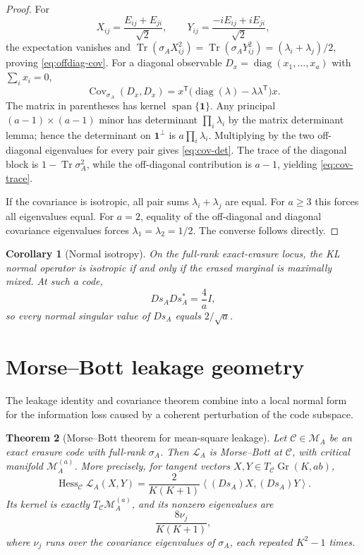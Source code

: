 \documentclass[11pt]{article}
\newtheorem{theorem}{Theorem}[section]
\newtheorem{corollary}[theorem]{Corollary}
\theoremstyle{definition}
\newcommand{\cC}{\mathcal C}
\newcommand{\cM}{\mathcal M}
\newcommand{\cL}{\mathcal L}
\newcommand{\Gr}{\operatorname{Gr}}
\newcommand{\Tr}{\operatorname{Tr}}
\newcommand{\Cov}{\operatorname{Cov}}
\newcommand{\1}{\mathbf 1}
\newcommand{\inner}[2]{\left\langle #1,#2\right\rangle}
\begin{document}
\begin{proof}
For
\[
X_{ij}=\frac{E_{ij}+E_{ji}}{\sqrt2},
\qquad
Y_{ij}=\frac{-iE_{ij}+iE_{ji}}{\sqrt2},
\]
the expectation vanishes and
$\Tr(\sigma_A X_{ij}^2)=\Tr(\sigma_A Y_{ij}^2)
=(\lambda_i+\lambda_j)/2$, proving \eqref{eq:offdiag-cov}.  For a diagonal observable $D_x=\operatorname{diag}(x_1,\ldots,x_a)$ with $\sum_i x_i=0$,
\[
\Cov_{\sigma_A}(D_x,D_x)
=
x^{\mathsf T}
\bigl(\operatorname{diag}(\lambda)-\lambda\lambda^{\mathsf T}\bigr)x.
\]
The matrix in parentheses has kernel $\operatorname{span}\{\mathbf1\}$.  Any principal $(a-1)\times(a-1)$ minor has determinant $\prod_i\lambda_i$ by the matrix determinant lemma; hence the determinant on $\mathbf1^\perp$ is $a\prod_i\lambda_i$.  Multiplying by the two off-diagonal eigenvalues for every pair gives \eqref{eq:cov-det}.  The trace of the diagonal block is $1-\Tr\sigma_A^2$, while the off-diagonal contribution is $a-1$, yielding \eqref{eq:cov-trace}.

If the covariance is isotropic, all pair sums $\lambda_i+\lambda_j$ are equal.  For $a\ge3$ this forces all eigenvalues equal.  For $a=2$, equality of the off-diagonal and diagonal covariance eigenvalues forces $\lambda_1=\lambda_2=1/2$.  The converse follows directly.
\end{proof}

\begin{corollary}[Normal isotropy]
\label{cor:normal-isotropy}
On the full-rank exact-erasure locus, the KL normal operator is isotropic if and only if the erased marginal is maximally mixed.  At such a code,
\[
Ds_A Ds_A^*=\frac4a I,
\]
so every normal singular value of $Ds_A$ equals $2/\sqrt a$.
\end{corollary}

\section{Morse--Bott leakage geometry}

The leakage identity and covariance theorem combine into a local normal form for the information loss caused by a coherent perturbation of the code subspace.

\begin{theorem}[Morse--Bott theorem for mean-square leakage]
\label{thm:morse-bott}
Let $\cC\in\cM_A$ be an exact erasure code with full-rank $\sigma_A$.  Then $\cL_A$ is Morse--Bott at $\cC$, with critical manifold $\cM_A^{(a)}$.  More precisely, for tangent vectors $X,Y\in T_{\cC}\Gr(K,ab)$,
\begin{equation}
\operatorname{Hess}_{\cC}\cL_A(X,Y)
=
\frac{2}{K(K+1)}
\inner{(Ds_A)X}{(Ds_A)Y}.
\label{eq:hessian}
\end{equation}
Its kernel is exactly $T_{\cC}\cM_A^{(a)}$, and its nonzero eigenvalues are
\begin{equation}
\boxed{
\frac{8\nu_j}{K(K+1)},
}
\label{eq:hessian-spectrum}
\end{equation}
where $\nu_j$ runs over the covariance eigenvalues of $\sigma_A$, each repeated $K^2-1$ times.
\end{theorem}
\end{document}
